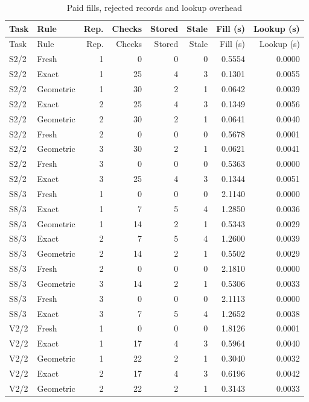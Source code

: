 \begingroup\small\setlength{\tabcolsep}{3pt}
\begin{longtable}{llrrrrrr}
\caption{Paid fills, rejected records and lookup overhead}\label{tab:operation-ledger72}\\
\hline
Task & Rule & Rep. & Checks & Stored & Stale & Fill (s) & Lookup (s) \\
\hline\endfirsthead
\hline
Task & Rule & Rep. & Checks & Stored & Stale & Fill (s) & Lookup (s) \\
\hline\endhead
S2/2 & Fresh & 1 & 0 & 0 & 0 & 0.5554 & 0.0000 \\
S2/2 & Exact & 1 & 25 & 4 & 3 & 0.1301 & 0.0055 \\
S2/2 & Geometric & 1 & 30 & 2 & 1 & 0.0642 & 0.0039 \\
S2/2 & Exact & 2 & 25 & 4 & 3 & 0.1349 & 0.0056 \\
S2/2 & Geometric & 2 & 30 & 2 & 1 & 0.0641 & 0.0040 \\
S2/2 & Fresh & 2 & 0 & 0 & 0 & 0.5678 & 0.0001 \\
S2/2 & Geometric & 3 & 30 & 2 & 1 & 0.0621 & 0.0041 \\
S2/2 & Fresh & 3 & 0 & 0 & 0 & 0.5363 & 0.0000 \\
S2/2 & Exact & 3 & 25 & 4 & 3 & 0.1344 & 0.0051 \\
S8/3 & Fresh & 1 & 0 & 0 & 0 & 2.1140 & 0.0000 \\
S8/3 & Exact & 1 & 7 & 5 & 4 & 1.2850 & 0.0036 \\
S8/3 & Geometric & 1 & 14 & 2 & 1 & 0.5343 & 0.0029 \\
S8/3 & Exact & 2 & 7 & 5 & 4 & 1.2600 & 0.0039 \\
S8/3 & Geometric & 2 & 14 & 2 & 1 & 0.5502 & 0.0029 \\
S8/3 & Fresh & 2 & 0 & 0 & 0 & 2.1810 & 0.0000 \\
S8/3 & Geometric & 3 & 14 & 2 & 1 & 0.5306 & 0.0033 \\
S8/3 & Fresh & 3 & 0 & 0 & 0 & 2.1113 & 0.0000 \\
S8/3 & Exact & 3 & 7 & 5 & 4 & 1.2652 & 0.0038 \\
V2/2 & Fresh & 1 & 0 & 0 & 0 & 1.8126 & 0.0001 \\
V2/2 & Exact & 1 & 17 & 4 & 3 & 0.5964 & 0.0040 \\
V2/2 & Geometric & 1 & 22 & 2 & 1 & 0.3040 & 0.0032 \\
V2/2 & Exact & 2 & 17 & 4 & 3 & 0.6196 & 0.0042 \\
V2/2 & Geometric & 2 & 22 & 2 & 1 & 0.3143 & 0.0033 \\

\end{longtable}
